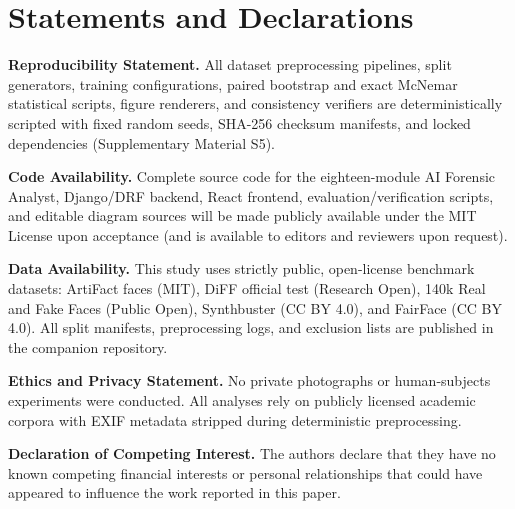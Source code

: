 \documentclass[final,5p,times,twocolumn,numafflabel]{elsarticle}
\begin{document}
\section*{Statements and Declarations}

\textbf{Reproducibility Statement.} All dataset preprocessing pipelines, split generators, training configurations, paired bootstrap and exact McNemar statistical scripts, figure renderers, and consistency verifiers are deterministically scripted with fixed random seeds, SHA-256 checksum manifests, and locked dependencies (Supplementary Material S5).

\textbf{Code Availability.} Complete source code for the eighteen-module AI Forensic Analyst, Django/DRF backend, React frontend, evaluation/verification scripts, and editable diagram sources will be made publicly available under the MIT License upon acceptance (and is available to editors and reviewers upon request).

\textbf{Data Availability.} This study uses strictly public, open-license benchmark datasets: ArtiFact faces (MIT), DiFF official test \cite{Cheng_2024} (Research Open), 140k Real and Fake Faces (Public Open), Synthbuster \cite{Bammey_2024} (CC BY 4.0), and FairFace (CC BY 4.0). All split manifests, preprocessing logs, and exclusion lists are published in the companion repository.

\textbf{Ethics and Privacy Statement.} No private photographs or human-subjects experiments were conducted. All analyses rely on publicly licensed academic corpora with EXIF metadata stripped during deterministic preprocessing.

\textbf{Declaration of Competing Interest.} The authors declare that they have no known competing financial interests or personal relationships that could have appeared to influence the work reported in this paper.



\end{document}
